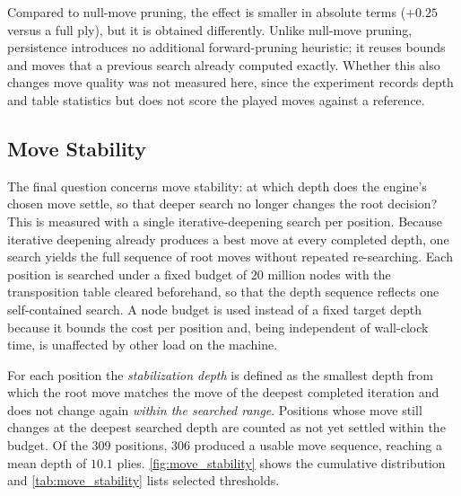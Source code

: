 Compared to null-move pruning, the effect is smaller in absolute terms ($+0.25$
versus a full ply), but it is obtained differently. Unlike null-move pruning,
persistence introduces no additional forward-pruning heuristic; it reuses bounds
and moves that a previous search already computed exactly. Whether this also
changes move quality was not measured here, since the experiment records depth
and table statistics but does not score the played moves against a reference.

\subsection{Move Stability}
\label{subsec:eval_move_stability}

The final question concerns move stability: at which depth does the engine's
chosen move settle, so that deeper search no longer changes the root decision?
This is measured with a single iterative-deepening search per position. Because
iterative deepening already produces a best move at every completed depth, one
search yields the full sequence of root moves without repeated re-searching. Each
position is searched under a fixed budget of 20 million nodes with the
transposition table cleared beforehand, so that the depth sequence reflects one
self-contained search. A node budget is used instead of a fixed target depth
because it bounds the cost per position and, being independent of wall-clock time,
is unaffected by other load on the machine.

For each position the \emph{stabilization depth} is defined as the smallest depth
from which the root move matches the move of the deepest completed iteration and
does not change again \emph{within the searched range}. Positions whose move still
changes at the deepest searched depth are counted as not yet settled within the
budget. Of the 309 positions, 306 produced a usable move sequence, reaching a mean
depth of $10.1$ plies. \cref{fig:move_stability} shows the cumulative distribution
and \cref{tab:move_stability} lists selected thresholds.

